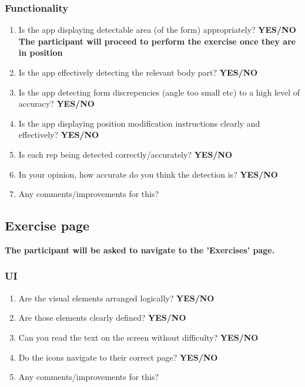 \documentclass[12pt, titlepage]{article}
\begin{document}
\subsubsection{Functionality}
\begin{enumerate}
    \item Is the app displaying detectable area (of the form) appropriately? \textbf{YES/NO} 
    \\\textbf{The participant will proceed to perform the exercise once they are in position}
    \item Is the app effectively detecting the relevant body part? \textbf{YES/NO}
    \item Is the app detecting form discrepencies (angle too small etc) to a high level of accuracy? \textbf{YES/NO}
    \item Is the app displaying position modification instructions clearly and effectively? \textbf{YES/NO}
    \item Is each rep being detected correctly/accurately? \textbf{YES/NO}
    \item In your opinion, how accurate do you think the detection is? \textbf{YES/NO}
    \item Any comments/improvements for this?
\end{enumerate}





\subsection{Exercise page}
\textbf{The participant will be asked to navigate to the 'Exercises' page.}
\subsubsection{UI}
\begin{enumerate}
    \item Are the visual elements arranged logically? \textbf{YES/NO}
    \item Are those elements clearly defined? \textbf{YES/NO}
    \item Can you read the text on the screen without difficulty? \textbf{YES/NO}
    \item Do the icons navigate to their correct page? \textbf{YES/NO}
    \item Any comments/improvements for this?
\end{enumerate}
\end{document}
